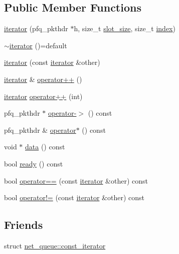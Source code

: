 \subsection*{Public Member Functions}
\begin{DoxyCompactItemize}
\item 
\hyperlink{structpfq_1_1net__queue_1_1iterator_a32b5b8db4f59df4c074e0aafe98c79a5}{iterator} (pfq\+\_\+pkthdr $\ast$h, size\+\_\+t \hyperlink{classpfq_1_1net__queue_a29b652b2c4e672bdfe65709483ad4319}{slot\+\_\+size}, size\+\_\+t \hyperlink{classpfq_1_1net__queue_a6f328cf50f038056f2b761bfaeca4c91}{index})
\item 
\hyperlink{structpfq_1_1net__queue_1_1iterator_a796f1d97807c57026713f2664bf992bc}{$\sim$iterator} ()=default
\item 
\hyperlink{structpfq_1_1net__queue_1_1iterator_a49a7278fa0b900830b46675c1365d370}{iterator} (const \hyperlink{structpfq_1_1net__queue_1_1iterator}{iterator} \&other)
\item 
\hyperlink{structpfq_1_1net__queue_1_1iterator}{iterator} \& \hyperlink{structpfq_1_1net__queue_1_1iterator_a4e7bf9ea9183af5efd3ade9a50e3350c}{operator++} ()
\item 
\hyperlink{structpfq_1_1net__queue_1_1iterator}{iterator} \hyperlink{structpfq_1_1net__queue_1_1iterator_ad108401f7fd2b6df0fa885ab651cc2fa}{operator++} (int)
\item 
pfq\+\_\+pkthdr $\ast$ \hyperlink{structpfq_1_1net__queue_1_1iterator_a13f873881322b7bd65bc9bf839d3c952}{operator-\/$>$} () const
\item 
pfq\+\_\+pkthdr \& \hyperlink{structpfq_1_1net__queue_1_1iterator_a8a684d858626d103487a73deb527ce10}{operator$\ast$} () const
\item 
void $\ast$ \hyperlink{structpfq_1_1net__queue_1_1iterator_acda266cd7e5ebc85615a3ffe827ad115}{data} () const
\item 
bool \hyperlink{structpfq_1_1net__queue_1_1iterator_aff387f94f0ab59c881c7c27c3f0e038d}{ready} () const
\item 
bool \hyperlink{structpfq_1_1net__queue_1_1iterator_a9258f2e0b450280b0934c3fa30717a3c}{operator==} (const \hyperlink{structpfq_1_1net__queue_1_1iterator}{iterator} \&other) const
\item 
bool \hyperlink{structpfq_1_1net__queue_1_1iterator_a9bcee65930cb4b4ce19845363aeaa34f}{operator!=} (const \hyperlink{structpfq_1_1net__queue_1_1iterator}{iterator} \&other) const
\end{DoxyCompactItemize}
\subsection*{Friends}
\begin{DoxyCompactItemize}
\item 
struct \hyperlink{structpfq_1_1net__queue_1_1iterator_a0fa1c59b5fb1d453f45032bc7a6ea3b0}{net\+\_\+queue\+::const\+\_\+iterator}
\end{DoxyCompactItemize}


